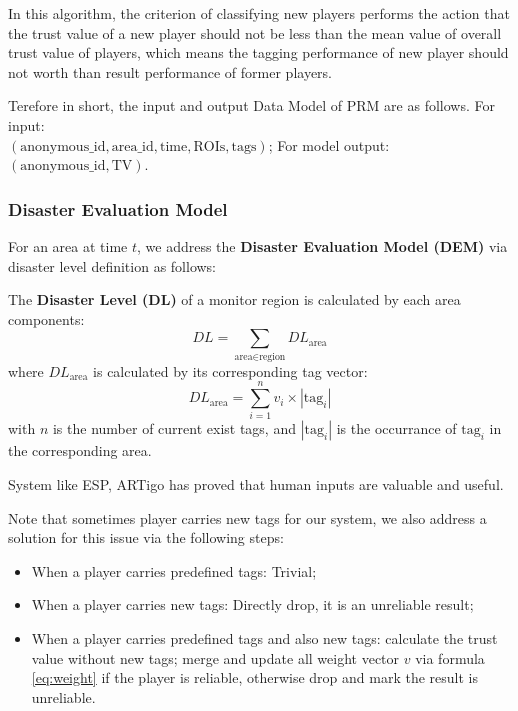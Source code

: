 In this algorithm, the criterion of classifying new players performs the action that 
the trust value of a new player should not be less than the mean value of overall trust value of players, 
which means the tagging performance of new player should not worth than result performance of former players.

Terefore in short, the input and output Data Model of PRM are as follows. For input:\\
$(\text{anonymous\_id}, \text{area\_id}, \text{time}, \text{ROIs}, \text{tags})$; 
For model output: 
$(\text{anonymous\_id}, \text{TV})$.

\subsubsection{Disaster Evaluation Model}
\label{chapter:dem}

For an area at time $t$, we address the \textbf{Disaster Evaluation Model (DEM)} 
via disaster level definition as follows:

\begin{definition}
\label{def:dl}
The \textbf{Disaster Level (DL)} of a monitor region is calculated by each area components:
\[
  DL = \sum_{\text{area}\in\text{region}}{DL_{\text{area}}}
\]
where $DL_{\text{area}}$ is calculated by its corresponding tag vector:
\[
  DL_{\text{area}} = \sum_{i=1}^{n}{v_i \times |\text{tag}_i|}
\]
with $n$ is the number of current exist tags, and $|\text{tag}_i|$ is the occurrance of $\text{tag}_i$
in the corresponding area.
\end{definition}

System like ESP\cite{von2004labeling}, ARTigo\cite{wieser2013artigo} has proved that 
human inputs are valuable and useful.

Note that sometimes player carries new tags for our system, we also address a solution 
for this issue via the following steps:

\begin{itemize}
\item When a player carries predefined tags: Trivial;
\item When a player carries new tags: Directly drop, it is an unreliable result;
\item When a player carries predefined tags and also new tags: calculate the trust value without new tags;
  merge and update all weight vector $v$ via formula \ref{eq:weight} if the player is reliable, 
  otherwise drop and mark the result is unreliable.
\end{itemize}


